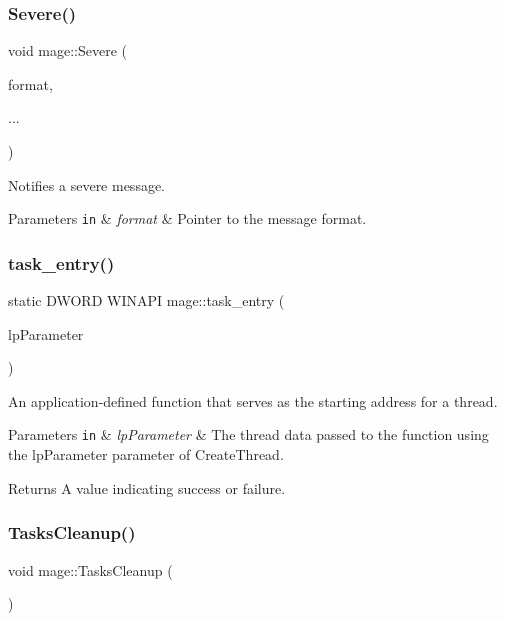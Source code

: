 \subsubsection{\texorpdfstring{Severe()}{Severe()}}
{\footnotesize\ttfamily void mage\+::\+Severe (\begin{DoxyParamCaption}\item[{const char $\ast$}]{format,  }\item[{}]{... }\end{DoxyParamCaption})}

Notifies a severe message.


\begin{DoxyParams}[1]{Parameters}
\mbox{\tt in}  & {\em format} & Pointer to the message format. \\
\hline
\end{DoxyParams}
\hypertarget{namespacemage_a1f113843a26e671776ec469adf7ccc51}{}\label{namespacemage_a1f113843a26e671776ec469adf7ccc51} 
\subsubsection{\texorpdfstring{task\+\_\+entry()}{task\_entry()}}
{\footnotesize\ttfamily static D\+W\+O\+RD W\+I\+N\+A\+PI mage\+::task\+\_\+entry (\begin{DoxyParamCaption}\item[{L\+P\+V\+O\+ID}]{lp\+Parameter }\end{DoxyParamCaption})\hspace{0.3cm}{\ttfamily [static]}}

An application-\/defined function that serves as the starting address for a thread.


\begin{DoxyParams}[1]{Parameters}
\mbox{\tt in}  & {\em lp\+Parameter} & The thread data passed to the function using the {\ttfamily lp\+Parameter} parameter of Create\+Thread. \\
\hline
\end{DoxyParams}
\begin{DoxyReturn}{Returns}
A value indicating success or failure. 
\end{DoxyReturn}
\hypertarget{namespacemage_a118ddaa5d9606328a0af412c85832e6b}{}\label{namespacemage_a118ddaa5d9606328a0af412c85832e6b} 
\subsubsection{\texorpdfstring{Tasks\+Cleanup()}{TasksCleanup()}}
{\footnotesize\ttfamily void mage\+::\+Tasks\+Cleanup (\begin{DoxyParamCaption}{ }\end{DoxyParamCaption})}

